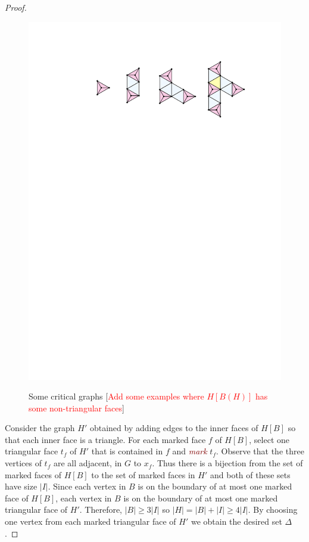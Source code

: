 \documentclass[12pt]{article}
\newcommand{\defin}[1]{\emph{\textcolor{Maroon}{#1}}}
\newcommand{\pat}[1]{[\textcolor{red}{#1}]}
\begin{document}
\begin{proof}
    \begin{figure}
        \begin{center}
            \includegraphics[page=1]{figs/critical} \\
        \end{center}
        \caption{Some critical graphs \pat{Add some examples where $H[B(H)]$ has some non-triangular faces}}
        \label{critical_fig}
    \end{figure}
    
  Consider the graph $H'$ obtained by adding edges to the inner faces of $H[B]$ so that each inner face is a triangle. For each marked face $f$ of $H[B]$, select one triangular face $t_f$ of $H'$ that is contained in $f$ and \defin{mark} $t_f$.  Observe that the three vertices of $t_f$ are all adjacent, in $G$ to $x_f$.  Thus there is a bijection from the set of marked faces of $H[B]$ to the set of marked faces in $H'$ and both of these sets have size $|I|$.  Since each vertex in $B$ is on the boundary of at most one marked face of $H[B]$, each vertex in $B$ is on the boundary of at most one marked triangular face of $H'$.  Therefore, $|B| \ge 3|I|$ so $|H|=|B|+|I|\ge 4|I|$.  By choosing one vertex from each marked triangular face of $H'$ we obtain the desired set $\Delta$. 
\end{proof}
\end{document}
